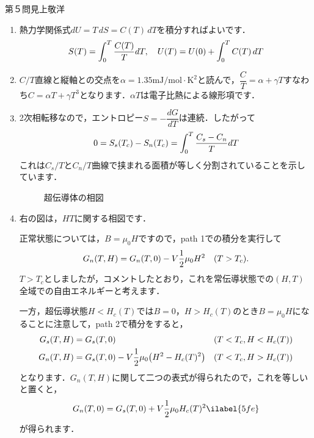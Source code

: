 \begin{answer}{第５問}{見上敬洋}
\begin{enumerate}
\item
  熱力学関係式$dU = T\,dS = C(T)\,dT$を積分すればよいです．
  \begin{equation}
  S(T) = \int_0^T \frac{C(T)}{T} dT , \quad 
  U(T) = U(0) + \int_0^T C(T) \,dT  \notag
  \end{equation}

\item
  $C/T$直線と縦軸との交点を$\alpha = 1.35 \mathrm{mJ/mol\cdot K^2}$と読んで，$\dfrac CT = \alpha + \gamma T$すなわち$C = \alpha T + \gamma T^3$となります．$\alpha T$は電子比熱による線形項です．

\item
  2次相転移なので，エントロピー$S = -\dfrac{dG}{dT}$は連続．したがって
  \begin{equation}
  0 = S_s(T_c) - S_n(T_c) = \int_0^T \frac{C_s -C_n}{T} dT \notag
  \end{equation}
  これは$C_s/T$と$C_n/T$曲線で挟まれる面積が等しく分割されていることを示しています．

  \begin{figure}[h]
    \begin{center}
      
    \end{center}
    \caption{超伝導体の相図 } 
  \end{figure}

\item
  右の図は，$HT$に関する相図です．

  正常状態については，$B = \mu_0 H$ですので，path 1での積分を実行して
  \begin{equation}
  G_n(T,H) = G_n(T,0) - V \frac 12 \mu_0 H^2 \quad ( T> T_c). \notag
  \end{equation}
  $T>T_c$としましたが，コメントしたとおり，これを常伝導状態での$(H,T)$全域での自由エネルギーと考えます．

  一方，超伝導状態$H<H_c(T)$では$B=0$，$H>H_c(T)$のとき$B = \mu_0 H$になることに注意して，path 2で積分をすると，
  \begin{align}
  G_s(T,H) &= G_s(T,0) & (T<T_c, H< H_c(T) ) \notag \\
  G_n(T,H) &= G_s(T,0) -V\dfrac 12 \mu_0 \big( H^2 -H_c(T)^2 \big) & (T<T_c,  H> H_c(T) ) \notag
  \end{align}
  となります．$G_n(T,H)$に関して二つの表式が得られたので，これを等しいと置くと， 
  \begin{equation}
  G_n(T,0) = G_s(T,0) + V \frac 12 \mu_0 H_c(T)^2 \ilabel{5fe}
  \end{equation}
  が得られます．


\end{enumerate}
\end{answer}
